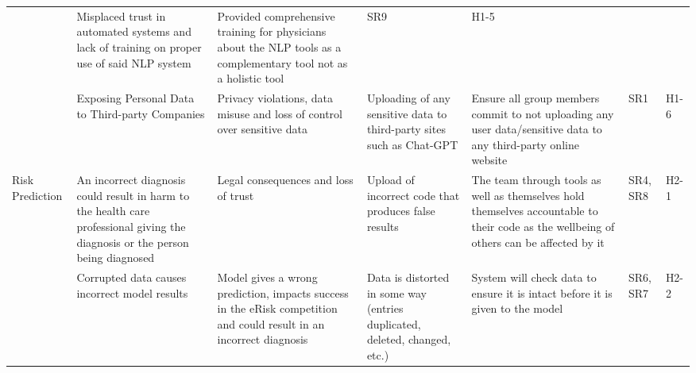 \documentclass{article}
\begin{document}
\begin{landscape}
\begin{longtable}{|p{}|p{}|p{}|p{}|p{}|p{}|p{}|}
       & Misplaced trust in automated systems and lack of training on proper use of said NLP system
       & Provided comprehensive training for physicians about the NLP tools as a complementary tool not as a holistic tool
       & SR9
       &  H1-5 \\
       \cline{2-7}
       & Exposing Personal Data to Third-party Companies
       & Privacy violations, data misuse and loss of control over sensitive data
       & Uploading of any sensitive data to third-party sites such as Chat-GPT
       & Ensure all group members commit to not uploading any user data/sensitive data to any third-party online website
       & SR1
       &  H1-6 \\
       \hline
       \multirow{2}{*}{Risk Prediction}
       & An incorrect diagnosis could result in harm to the health care professional giving the diagnosis or the person being diagnosed
       & Legal consequences and loss of trust
       & Upload of incorrect code that produces false results
       & The team through tools as well as themselves hold themselves accountable to their code as the wellbeing of others can be affected by it
       & SR4, SR8
       & H2-1 \\
       \cline{2-7}
       & Corrupted data causes incorrect model results
       & Model gives a wrong prediction, impacts success in the eRisk competition and could result in an incorrect diagnosis
       & Data is distorted in some way (entries duplicated, deleted, changed, etc.)
       & System will check data to ensure it is intact before it is given to the model
       & SR6, SR7
       & H2-2 \\
       \hline
   \end{longtable}
\end{landscape}
\end{document}
